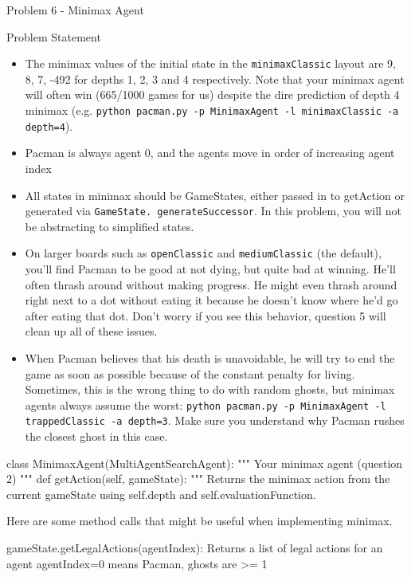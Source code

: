 \begin{problem}{Problem 6 - Minimax Agent}
\begin{statement}{Problem Statement}
        \begin{itemize}
            \item The minimax values of the initial state in the \texttt{minimaxClassic} layout are 9, 8, 7, -492 for depths 1, 2, 3 and 4 respectively. Note that your minimax agent will often win 
            (665/1000 games for us) despite the dire prediction of depth 4 minimax (e.g. \texttt{python pacman.py -p MinimaxAgent -l minimaxClassic -a depth=4}).
            \item Pacman is always agent 0, and the agents move in order of increasing agent index
            \item All states in minimax should be GameStates, either passed in to getAction or generated via \texttt{GameState. generateSuccessor}. In this problem, you will not be abstracting to simplified states.
            \item On larger boards such as \texttt{openClassic} and \texttt{mediumClassic} (the default), you'll find Pacman to be good at not dying, but quite bad at winning. He'll often thrash around 
            without making progress. He might even thrash around right next to a dot without eating it because he doesn't know where he'd go after eating that dot. Don't worry if you see this behavior, 
            question 5 will clean up all of these issues.
            \item When Pacman believes that his death is unavoidable, he will try to end the game as soon as possible because of the constant penalty for living. Sometimes, this is the wrong thing to 
            do with random ghosts, but minimax agents always assume the worst: \texttt{python pacman.py -p MinimaxAgent -l trappedClassic -a depth=3}. Make sure you understand why Pacman rushes the 
            closest ghost in this case.
        \end{itemize}
    \end{statement}

    \begin{highlight}[Solution]
    \begin{code}[Python]
    class MinimaxAgent(MultiAgentSearchAgent):
    """
        Your minimax agent (question 2)
    """
    def getAction(self, gameState):
        """
        Returns the minimax action from the current gameState using self.depth
        and self.evaluationFunction.

        Here are some method calls that might be useful when implementing minimax.

        gameState.getLegalActions(agentIndex):
            Returns a list of legal actions for an agent
            agentIndex=0 means Pacman, ghosts are >= 1


\end{code}
\end{highlight}
\end{problem}
